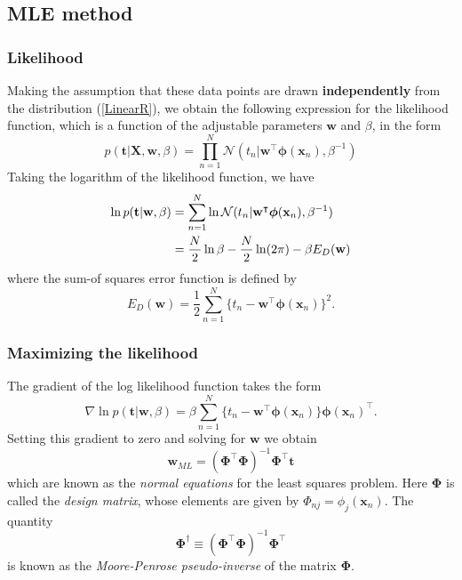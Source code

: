 \documentclass[a4paper]{report}
\renewcommand{\bf}{\mathbf}
\renewcommand{\cal}{\mathcal}
\newcommand{\imp}[1]{{\color{blue}\textit{#1}}}
\newcommand{\bs}{\boldsymbol}
\begin{document}
\subsection{MLE method}
\subsubsection{Likelihood}
Making the assumption that these data points are drawn \textbf{independently} from the distribution (\ref{LinearR}), we obtain the following expression for the likelihood function, which is a function of the adjustable parameters $\bf{w}$ and $\beta$, in the form
\begin{equation}
p(\bf{t}|\bf{X,w},\beta) = \prod_{n=1}^N \cal{N}(t_n|\bf{w}^{\intercal} \bs{\phi}(\bf{x}_n),\beta^{-1})
\end{equation}
Taking the logarithm of the likelihood function, we have
\begin{align}
	\ln p(\bf{t}|\bf{w},\beta) &= \sum_{n=1}^N \ln \cal{N}(t_n|\bf{w}^{\intercal} \bs{\phi}(\bf{x}_n),\beta^{-1}) \notag \\
	&= \frac{N}{2} \ln \beta - \frac{N}{2} \ln(2\pi) - \beta E_D(\bf{w})
\end{align}
where the sum-of squares error function is defined by
\begin{equation}
	E_D(\bf{w}) = \frac{1}{2} \sum_{n=1}^N \{ t_n - \bf{w}^{\intercal} \bs{\phi}(\bf{x}_n) \}^2.
\end{equation}
\subsubsection{Maximizing the likelihood}
The gradient of the log likelihood function takes the form
\begin{equation}
	\nabla \ln p(\bf{t}|\bf{w},\beta) = \beta \sum_{n=1}^N \{ t_n-\bf{w}^{\intercal} \bs{\phi}(\bf{x}_n) \} \bs{\phi}(\bf{x}_n)^{\intercal}.
\end{equation}
Setting this gradient to zero and solving for $\bf{w}$ we obtain
\begin{equation}
	\bf{w}_{ML} = (\bs{\Phi}^{\intercal} \bs{\Phi})^{-1} \bs{\Phi}^{\intercal} \bf{t}
\end{equation}
which are known as the \imp{normal equations} for the least squares problem. Here $\bs{\Phi}$ is called the \imp{design matrix}, whose elements are given by $\Phi_{nj} = \phi_j (\bf{x}_n)$. The quantity
\begin{equation}
	\bs{\Phi}^{\dagger} \equiv (\bs{\Phi}^{\intercal} \bs{\Phi})^{-1} \bs{\Phi}^{\intercal}
\end{equation}
is known as the \imp{Moore-Penrose pseudo-inverse} of the matrix $\bs{\Phi}$.
\end{document}
